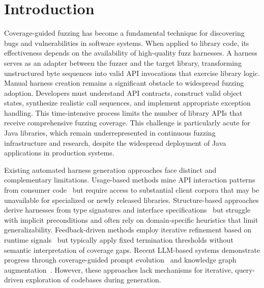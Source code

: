 \section{Introduction}

Coverage-guided fuzzing has become a fundamental technique for discovering bugs and vulnerabilities in software systems. When applied to library code, its effectiveness depends on the availability of high-quality fuzz harnesses. A harness serves as an adapter between the fuzzer and the target library, transforming unstructured byte sequences into valid API invocations that exercise library logic. Manual harness creation remains a significant obstacle to widespread fuzzing adoption. Developers must understand API contracts, construct valid object states, synthesize realistic call sequences, and implement appropriate exception handling. This time-intensive process limits the number of library APIs that receive comprehensive fuzzing coverage. This challenge is particularly acute for Java libraries, which remain underrepresented in continuous fuzzing infrastructure and research, despite the widespread deployment of Java applications in production systems. 

Existing automated harness generation approaches face distinct and complementary limitations. Usage-based methods mine API interaction patterns from consumer code~\cite{DBLP:conf/sigsoft/BabicBCIKKLSW19:FUDGE,DBLP:conf/sp/JeongJYMKJKSH23:UTopia} but require access to substantial client corpora that may be unavailable for specialized or newly released libraries. Structure-based approaches derive harnesses from type signatures and interface specifications~\cite{DBLP:conf/icse:GreenA22:GraphFuzz,DBLP:conf/icse:ShermanN25:OGHarn} but struggle with implicit preconditions and often rely on domain-specific heuristics that limit generalizability. Feedback-driven methods employ iterative refinement based on runtime signals~\cite{DBLP:conf/uss:ZhangLZZZZXLL0H23:Rubick} but typically apply fixed termination thresholds without semantic interpretation of coverage gaps. Recent LLM-based systems demonstrate progress through coverage-guided prompt evolution~\cite{DBLP:conf/ccs:LyuXCC24:PromptFuzz} and knowledge graph augmentation~\cite{DBLP:conf/icse:XuMZZCHLW25:CKGFuzzer}. However, these approaches lack mechanisms for iterative, query-driven exploration of codebases during generation. 

